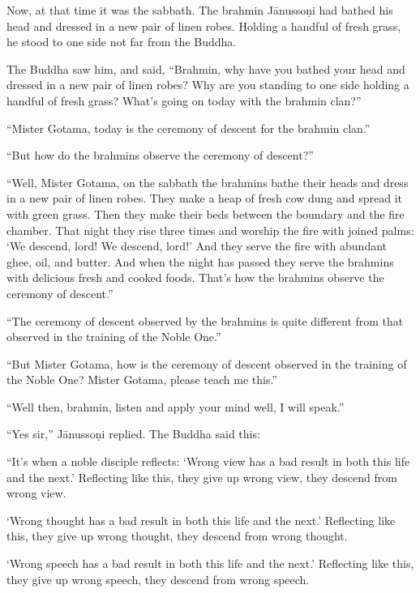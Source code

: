 \documentclass[12pt,openany]{book}%
\begin{document}
Now, at that time it was the sabbath. The brahmin \textsanskrit{Jānussoṇi} had bathed his head and dressed in a new pair of linen robes. Holding a handful of fresh grass, he stood to one side not far from the Buddha. 

The Buddha saw him, and said, “Brahmin, why have you bathed your head and dressed in a new pair of linen robes? Why are you standing to one side holding a handful of fresh grass? What’s going on today with the brahmin clan?” 

“Mister Gotama, today is the ceremony of descent for the brahmin clan.” 

“But how do the brahmins observe the ceremony of descent?” 

“Well, Mister Gotama, on the sabbath the brahmins bathe their heads and dress in a new pair of linen robes. They make a heap of fresh cow dung and spread it with green grass. Then they make their beds between the boundary and the fire chamber. That night they rise three times and worship the fire with joined palms: ‘We descend, lord! We descend, lord!’ And they serve the fire with abundant ghee, oil, and butter. And when the night has passed they serve the brahmins with delicious fresh and cooked foods. That’s how the brahmins observe the ceremony of descent.” 

“The ceremony of descent observed by the brahmins is quite different from that observed in the training of the Noble One.” 

“But Mister Gotama, how is the ceremony of descent observed in the training of the Noble One? Mister Gotama, please teach me this.” 

“Well then, brahmin, listen and apply your mind well, I will speak.” 

“Yes sir,” \textsanskrit{Jānussoṇi} replied. The Buddha said this: 

“It’s when a noble disciple reflects: ‘Wrong view has a bad result in both this life and the next.’ Reflecting like this, they give up wrong view, they descend from wrong view. 

‘Wrong thought has a bad result in both this life and the next.’ Reflecting like this, they give up wrong thought, they descend from wrong thought. 

‘Wrong speech has a bad result in both this life and the next.’ Reflecting like this, they give up wrong speech, they descend from wrong speech. 
\end{document}
